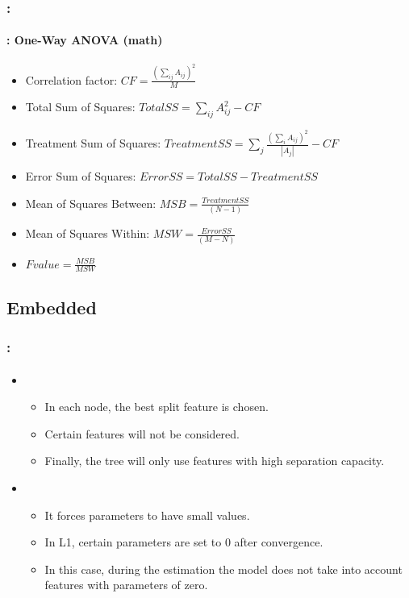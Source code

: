 \documentclass[xcolor=table]{beamer}%
\begin{document}
\begin{frame}
	\frametitle{\insertshortsubtitle: \insertsection}
	\framesubtitle{\insertsubsection: One-Way ANOVA (math)}
	
	\begin{itemize}
		\item Correlation factor: $CF = \frac{(\sum_{ij} A_{ij})^2}{M} $
		\item Total Sum of Squares: $TotalSS = \sum_{ij} A_{ij}^2 - CF$
		\item Treatment Sum of Squares: $TreatmentSS = \sum_j \frac{(\sum_{i} A_{ij})^2}{|A_j|} - CF$
		\item Error Sum of Squares: $ErrorSS = TotalSS - TreatmentSS$
		\item Mean of Squares Between: $MSB = \frac{TreatmentSS}{(N - 1)}$
		\item Mean of Squares Within: $MSW =  \frac{ErrorSS}{(M - N)}$
		\item $Fvalue = \frac{MSB}{MSW}$
	\end{itemize}
	
\end{frame}

\subsection{Embedded}

\begin{frame}
	\frametitle{\insertshortsubtitle: \insertsection}
	\framesubtitle{\insertsubsection}
	
	\begin{itemize}
		\item {}
		\begin{itemize}
			\item In each node, the best split feature is chosen.
			\item Certain features will not be considered.
			\item Finally, the tree will only use features with high separation capacity.
		\end{itemize}
		\item {}
		\begin{itemize}
			\item It forces parameters to have small values.
			\item In L1, certain parameters are set to 0 after convergence.
			\item In this case, during the estimation the model does not take into account features with parameters of zero.
		\end{itemize}
	\end{itemize}
	
\end{frame}
\end{document}
